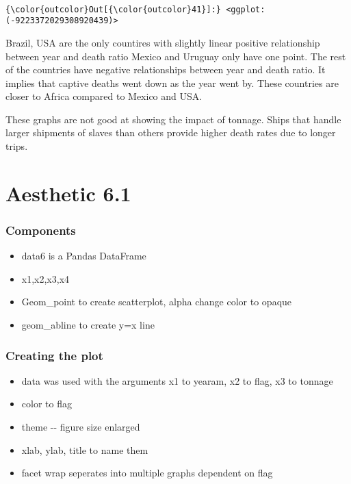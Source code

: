 \documentclass[11pt]{article}
\providecommand{\tightlist}{%
      \setlength{\itemsep}{0pt}\setlength{\parskip}{0pt}}
\begin{document}
    \begin{center}
    \end{center}
    { \hspace*{\fill} \\}
    
\begin{Verbatim}[commandchars=\\\{\}]
{\color{outcolor}Out[{\color{outcolor}41}]:} <ggplot: (-9223372029308920439)>
\end{Verbatim}
            
    Brazil, USA are the only countires with slightly linear positive
relationship between year and death ratio Mexico and Uruguay only have
one point. The rest of the countries have negative relationships between
year and death ratio. It implies that captive deaths went down as the
year went by. These countries are closer to Africa compared to Mexico
and USA.

These graphs are not good at showing the impact of tonnage. Ships that
handle larger shipments of slaves than others provide higher death rates
due to longer trips.

    \section{Aesthetic 6.1}\label{aesthetic-6.1}

\subsubsection{Components}\label{components}

\begin{itemize}
\tightlist
\item
  data6 is a Pandas DataFrame
\item
  x1,x2,x3,x4
\item
  Geom\_point to create scatterplot, alpha change color to opaque
\item
  geom\_abline to create y=x line
\end{itemize}

\subsubsection{Creating the plot}\label{creating-the-plot}

\begin{itemize}
\tightlist
\item
  data was used with the arguments x1 to yearam, x2 to flag, x3 to
  tonnage
\item
  color to flag
\item
  theme -\/- figure size enlarged
\item
  xlab, ylab, title to name them
\item
  facet wrap seperates into multiple graphs dependent on flag
\end{itemize}
\end{document}
